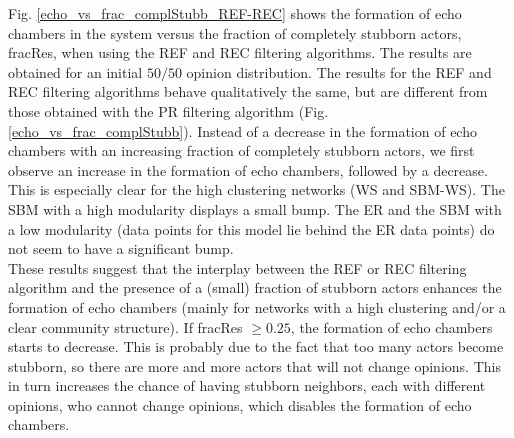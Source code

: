 \documentclass[11 pt , letterpaper , twoside , openright]{book}
\begin{document}
\noindent
Fig. \ref{echo_vs_frac_complStubb_REF-REC} shows the formation of echo chambers in the system versus the fraction of completely stubborn actors, fracRes, when using the REF and REC filtering algorithms. The results are obtained for an initial $50/50$ opinion distribution. The results for the REF and REC filtering algorithms behave qualitatively the same, but are different from those obtained with the PR filtering algorithm (Fig. \ref{echo_vs_frac_complStubb}). Instead of a decrease in the formation of echo chambers with an increasing fraction of completely stubborn actors, we first observe an increase in the formation of echo chambers, followed by a decrease. This is especially clear for the high clustering networks (WS and SBM-WS). The SBM with a high modularity displays a small bump. The ER and the SBM with a low modularity (data points for this model lie behind the ER data points) do not seem to have a significant bump.\\
\newline
These results suggest that the interplay between the REF or REC filtering algorithm and the presence of a (small) fraction of stubborn actors enhances the formation of echo chambers (mainly for networks with a high clustering and/or a clear community structure). If fracRes $\geqslant 0.25$, the formation of echo chambers starts to decrease. This is probably due to the fact that too many actors become stubborn, so there are more and more actors that will not change opinions. This in turn increases the chance of having stubborn neighbors, each with different opinions, who cannot change opinions, which disables the formation of echo chambers.\\
\newline
\end{document}
